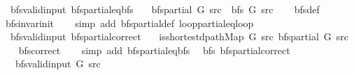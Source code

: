 \begin{isabellebody}
\isanewline
%
\endisadelimproof
\isanewline
{}\isamarkupfalse%
\ {\isacharparenleft}{\kern0pt}\ bfs{\isacharunderscore}{\kern0pt}valid{\isacharunderscore}{\kern0pt}input{\isacharparenright}{\kern0pt}\ bfs{\isacharunderscore}{\kern0pt}partial{\isacharunderscore}{\kern0pt}eq{\isacharunderscore}{\kern0pt}bfs{\isacharcolon}{\kern0pt}\isanewline
\ \ \ {\isachardoublequoteopen}bfs{\isacharunderscore}{\kern0pt}partial\ G\ src\ {\isacharequal}{\kern0pt}\ bfs\ G\ src{\isachardoublequoteclose}\isanewline
%
\isadelimproof
\ \ %
\endisadelimproof
%
\isatagproof
{}\isamarkupfalse%
\ bfs{\isacharunderscore}{\kern0pt}def\isanewline
\ \ \isamarkupfalse%
\ bfs{\isacharunderscore}{\kern0pt}invar{\isacharunderscore}{\kern0pt}init\isanewline
\ \ \isamarkupfalse%
\ {\isacharparenleft}{\kern0pt}simp\ add{\isacharcolon}{\kern0pt}\ bfs{\isacharunderscore}{\kern0pt}partial{\isacharunderscore}{\kern0pt}def\ loop{\isacharunderscore}{\kern0pt}partial{\isacharunderscore}{\kern0pt}eq{\isacharunderscore}{\kern0pt}loop{\isacharparenright}{\kern0pt}%
\endisatagproof
{\isafoldproof}%
%
\isadelimproof
\isanewline
%
\endisadelimproof
\isanewline
{}\isamarkupfalse%
\ {\isacharparenleft}{\kern0pt}\ bfs{\isacharunderscore}{\kern0pt}valid{\isacharunderscore}{\kern0pt}input{\isacharparenright}{\kern0pt}\ bfs{\isacharunderscore}{\kern0pt}partial{\isacharunderscore}{\kern0pt}correct{\isacharcolon}{\kern0pt}\isanewline
\ \ \ {\isachardoublequoteopen}is{\isacharunderscore}{\kern0pt}shortest{\isacharunderscore}{\kern0pt}dpath{\isacharunderscore}{\kern0pt}Map\ G\ src\ {\isacharparenleft}{\kern0pt}bfs{\isacharunderscore}{\kern0pt}partial\ G\ src{\isacharparenright}{\kern0pt}{\isachardoublequoteclose}\isanewline
%
\isadelimproof
\ \ %
\endisadelimproof
%
\isatagproof
{}\isamarkupfalse%
\ bfs{\isacharunderscore}{\kern0pt}correct\isanewline
\ \ \isamarkupfalse%
\ {\isacharparenleft}{\kern0pt}simp\ add{\isacharcolon}{\kern0pt}\ bfs{\isacharunderscore}{\kern0pt}partial{\isacharunderscore}{\kern0pt}eq{\isacharunderscore}{\kern0pt}bfs{\isacharparenright}{\kern0pt}%
\endisatagproof
{\isafoldproof}%
%
\isadelimproof
\isanewline
%
\endisadelimproof
\isanewline
{}\isamarkupfalse%
\ {\isacharparenleft}{\kern0pt}\ bfs{\isacharparenright}{\kern0pt}\ bfs{\isacharunderscore}{\kern0pt}partial{\isacharunderscore}{\kern0pt}correct{\isacharcolon}{\kern0pt}\isanewline
\ \ \ {\isachardoublequoteopen}bfs{\isacharunderscore}{\kern0pt}valid{\isacharunderscore}{\kern0pt}input{\isacharprime}{\kern0pt}\ G\ src{\isachardoublequoteclose}\isanewline

\end{isabellebody}
